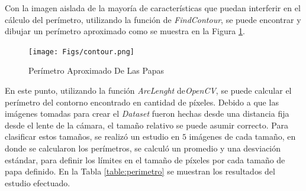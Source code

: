 Con la imagen aislada de la mayoría de características que puedan interferir en el cálculo del perímetro, utilizando la función de \textit{FindContour}, se puede encontrar y dibujar un perímetro aproximado como se muestra en la Figura \ref{fig:contour}.

\begin{figure}[ht]
	\centering
	\texttt{[image: Figs/contour.png]}
	\caption{Perímetro Aproximado De Las Papas}
	\label{fig:contour}
\end{figure}

En este punto, utilizando la función \textit{ArcLenght} de\textit{OpenCV}, se puede calcular el perímetro del contorno encontrado en cantidad de píxeles. Debido a que las imágenes tomadas para crear el \textit{Dataset} fueron hechas desde una distancia fija desde el lente de la cámara, el tamaño relativo se puede asumir correcto. Para clasificar estos tamaños, se realizó un estudio en $5$ imágenes de cada tamaño, en donde se calcularon los perímetros, se calculó un promedio y una desviación estándar, para definir los límites en el tamaño de píxeles por cada tamaño de papa definido. En la Tabla \ref{table:perimetro} se muestran los resultados del estudio efectuado.

